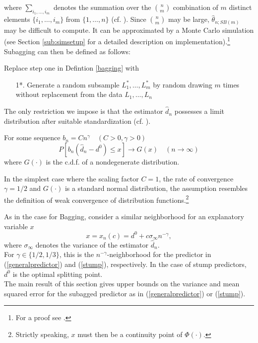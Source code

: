 where $\sum_{i_{1}, \dots, i_{m}}$ denotes the summation over the $\binom{n}{m}$ combination of $m$ distinct elements $\{i_{1}, \dots, i_{m}\}$ from $\{1, \dots, n\}$ (cf. \cite{serfling}).
Since $\binom{n}{m}$ may be large, $\hat{\theta}_{n;SB(m)}$ may be difficult to compute. It can be approximated by a Monte Carlo simulation (see Section \ref{sub:simsetup} for a detailed description on implementation).\footnote{For a proof see \cite{politis1994}.} Subagging can then be defined as follows:

\begin{definition}[Subagging]
Replace step one in Defintion \ref{bagging} with
\begin{enumerate}
	\item[1*.] Generate a random subsample $L_{1}^{*}, \dots, L_{m}^{*}$ by random drawing $m$ times without replacement from the data $L_{1}, \dots, L_{n}$

\end{enumerate}
\end{definition}


The only restriction we impose is that the estimator $\hat{d}_{n}$ possesses a limit distribution after suitable standardization (cf. \cite{politis1994}).

\begin{assumption} \label{A3}
For some sequence $b_{n}=Cn^{\gamma} \quad (C>0, \gamma >0)$
$$
P[b_{n}(\hat{d}_{n} - d^{0}) \leq x] \rightarrow G(x) \quad (n \rightarrow \infty)
$$
where $G(\cdot)$ is the c.d.f. of a nondegenerate distribution.

\end{assumption}

In the simplest case where the scaling factor $C=1$, the rate of convergence $\gamma=1/2$ and $G(\cdot)$ is a standard normal distribution, the assumption resembles the definition of weak convergence of distribution functions.\footnote{Strictly speaking, $x$ must then be a continuity point of $\Phi(\cdot)$.}

As in the case for Bagging, consider a similar neighborhood for an explanatory variable $x$
$$ x = x_{n}(c)= d^{0} + c\sigma_{\infty} n^{-\gamma},$$
where $\sigma_{\infty}$ denotes the variance of the estimator $\hat{d}_{n}$.\\
For $\gamma \in \{1/2, 1/3\}$, this is the $n^{-\gamma}$-neighborhood for the predictor in (\ref{generalpredictor}) and (\ref{stump}), respectively. In the case of stump predictors, $d^{0}$ is the optimal splitting point.\\
The main result of this section gives upper bounds on the variance and mean squared error for the subagged predictor as in (\ref{generalpredictor}) or (\ref{stump}).


